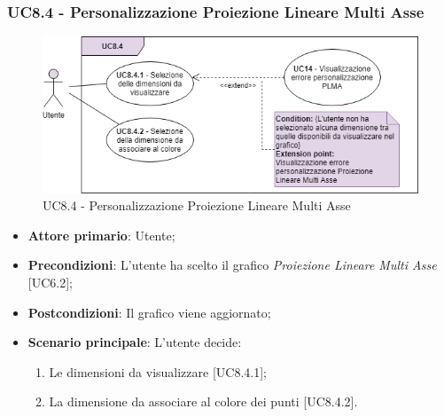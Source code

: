\subsubsection{UC8.4 - Personalizzazione Proiezione Lineare Multi Asse}
\begin{figure}[h]
\includegraphics[width=\linewidth]{Section/Images/UC8.4.png}
\centering
\caption{UC8.4 - Personalizzazione Proiezione Lineare Multi Asse}
\end{figure}
\begin{itemize}
	\item \textbf{Attore primario}: Utente;
	
	\item \textbf{Precondizioni}: L'utente ha scelto il grafico \textit{Proiezione Lineare Multi Asse} [UC6.2];
	
	\item \textbf{Postcondizioni}: Il grafico viene aggiornato;
	
	\item \textbf{Scenario principale}: L'utente decide:
	
\begin{enumerate}
\item Le dimensioni da visualizzare [UC8.4.1];
\item La dimensione da associare al colore dei punti [UC8.4.2].
\end{enumerate}	
		
\end{itemize}